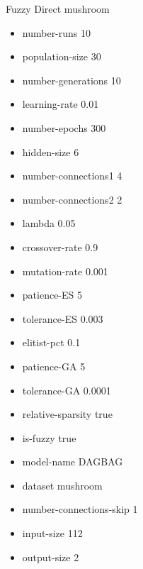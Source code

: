 Fuzzy Direct
mushroom
\begin{itemize}
\item number-runs 10
\item population-size 30
\item number-generations 10
\item learning-rate 0.01
\item number-epochs 300
\item hidden-size 6
\item number-connections1 4
\item number-connections2 2
\item lambda 0.05
\item crossover-rate 0.9
\item mutation-rate 0.001
\item patience-ES 5
\item tolerance-ES 0.003
\item elitist-pct 0.1
\item patience-GA 5
\item tolerance-GA 0.0001
\item relative-sparsity true
\item is-fuzzy true
\item model-name DAGBAG
\item dataset mushroom
\item number-connections-skip 1
\item input-size 112
\item output-size 2
\end{itemize}

